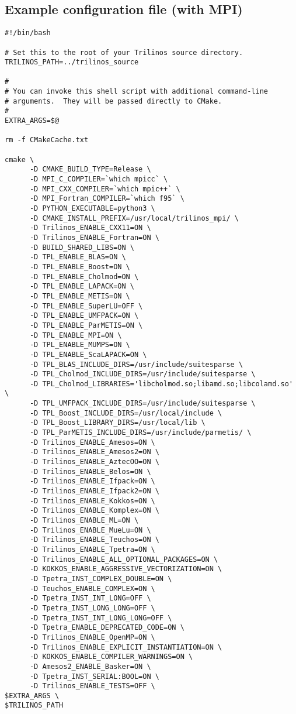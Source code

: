 \subsection{Example configuration file (with MPI)}
\begin{verbatim}
#!/bin/bash

# Set this to the root of your Trilinos source directory.
TRILINOS_PATH=../trilinos_source

#
# You can invoke this shell script with additional command-line
# arguments.  They will be passed directly to CMake.
#
EXTRA_ARGS=$@

rm -f CMakeCache.txt

cmake \
      -D CMAKE_BUILD_TYPE=Release \
      -D MPI_C_COMPILER=`which mpicc` \
      -D MPI_CXX_COMPILER=`which mpic++` \
      -D MPI_Fortran_COMPILER=`which f95` \
      -D PYTHON_EXECUTABLE=python3 \
      -D CMAKE_INSTALL_PREFIX=/usr/local/trilinos_mpi/ \
      -D Trilinos_ENABLE_CXX11=ON \
      -D Trilinos_ENABLE_Fortran=ON \
      -D BUILD_SHARED_LIBS=ON \
      -D TPL_ENABLE_BLAS=ON \
      -D TPL_ENABLE_Boost=ON \
      -D TPL_ENABLE_Cholmod=ON \
      -D TPL_ENABLE_LAPACK=ON \
      -D TPL_ENABLE_METIS=ON \
      -D TPL_ENABLE_SuperLU=OFF \
      -D TPL_ENABLE_UMFPACK=ON \
      -D TPL_ENABLE_ParMETIS=ON \
      -D TPL_ENABLE_MPI=ON \
      -D TPL_ENABLE_MUMPS=ON \
      -D TPL_ENABLE_ScaLAPACK=ON \
      -D TPL_BLAS_INCLUDE_DIRS=/usr/include/suitesparse \
      -D TPL_Cholmod_INCLUDE_DIRS=/usr/include/suitesparse \
      -D TPL_Cholmod_LIBRARIES='libcholmod.so;libamd.so;libcolamd.so' \
      -D TPL_UMFPACK_INCLUDE_DIRS=/usr/include/suitesparse \
      -D TPL_Boost_INCLUDE_DIRS=/usr/local/include \
      -D TPL_Boost_LIBRARY_DIRS=/usr/local/lib \
      -D TPL_ParMETIS_INCLUDE_DIRS=/usr/include/parmetis/ \
      -D Trilinos_ENABLE_Amesos=ON \
      -D Trilinos_ENABLE_Amesos2=ON \
      -D Trilinos_ENABLE_AztecOO=ON \
      -D Trilinos_ENABLE_Belos=ON \
      -D Trilinos_ENABLE_Ifpack=ON \
      -D Trilinos_ENABLE_Ifpack2=ON \
      -D Trilinos_ENABLE_Kokkos=ON \
      -D Trilinos_ENABLE_Komplex=ON \
      -D Trilinos_ENABLE_ML=ON \
      -D Trilinos_ENABLE_MueLu=ON \
      -D Trilinos_ENABLE_Teuchos=ON \
      -D Trilinos_ENABLE_Tpetra=ON \
      -D Trilinos_ENABLE_ALL_OPTIONAL_PACKAGES=ON \
      -D KOKKOS_ENABLE_AGGRESSIVE_VECTORIZATION=ON \
      -D Tpetra_INST_COMPLEX_DOUBLE=ON \
      -D Teuchos_ENABLE_COMPLEX=ON \
      -D Tpetra_INST_INT_LONG=OFF \
      -D Tpetra_INST_LONG_LONG=OFF \
      -D Tpetra_INST_INT_LONG_LONG=OFF \
      -D Tpetra_ENABLE_DEPRECATED_CODE=ON \
      -D Trilinos_ENABLE_OpenMP=ON \
      -D Trilinos_ENABLE_EXPLICIT_INSTANTIATION=ON \
      -D KOKKOS_ENABLE_COMPILER_WARNINGS=ON \
      -D Amesos2_ENABLE_Basker=ON \
      -D Tpetra_INST_SERIAL:BOOL=ON \
      -D Trilinos_ENABLE_TESTS=OFF \
$EXTRA_ARGS \
$TRILINOS_PATH
\end{verbatim}
